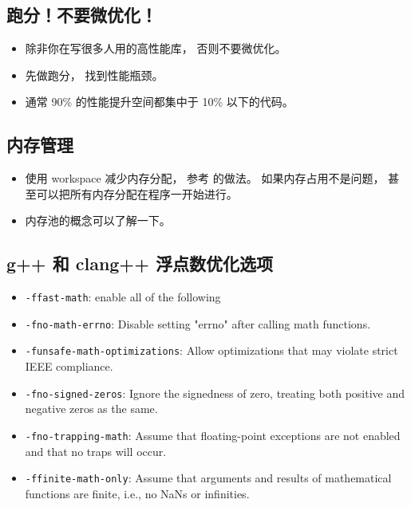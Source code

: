 
\begin{issues}
\issueDraft
\end{issues}


\subsection{跑分！不要微优化！}
\begin{itemize}
\item 除非你在写很多人用的高性能库， 否则不要微优化。
\item 先做跑分， 找到性能瓶颈。
\item 通常 90\% 的性能提升空间都集中于 10\% 以下的代码。
\end{itemize}


\subsection{内存管理}
\begin{itemize}
\item 使用 workspace 减少内存分配， 参考 的做法。 如果内存占用不是问题， 甚至可以把所有内存分配在程序一开始进行。
\item 内存池的概念可以了解一下。
\end{itemize}

\subsection{g++ 和 clang++ 浮点数优化选项}
\begin{itemize}
\item \verb|-ffast-math|: enable all of the following
\item \verb|-fno-math-errno|: Disable setting "errno" after calling math functions.
\item \verb|-funsafe-math-optimizations|: Allow optimizations that may violate strict IEEE compliance.
\item \verb|-fno-signed-zeros|: Ignore the signedness of zero, treating both positive and negative zeros as the same.
\item \verb|-fno-trapping-math|: Assume that floating-point exceptions are not enabled and that no traps will occur.
\item \verb|-ffinite-math-only|: Assume that arguments and results of mathematical functions are finite, i.e., no NaNs or infinities.
\end{itemize}
